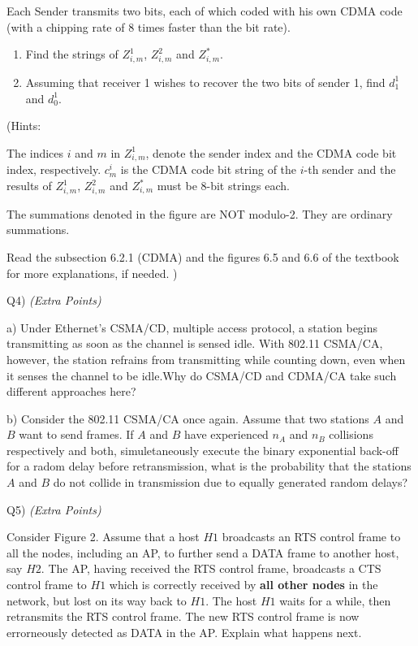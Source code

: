 \documentclass[10pt,letterpaper]{article}
\begin{document}
Each Sender transmits two bits, each of which coded with his own CDMA code (with a chipping rate of 8 times faster than the bit rate).
\begin{enumerate}[label=\alph*-]
\item
Find the strings of $Z_{i,m}^1$, $Z_{i,m}^2$ and $Z_{i,m}^*$.
\item
Assuming that receiver 1 wishes to recover the two bits of sender 1, find $d_1^1$ and $d_0^1$.
\end{enumerate}
(Hints:

The indices $i$ and $m$ in $Z_{i,m}^1$, denote the sender index and the CDMA code bit index, respectively. $c_m^i$ is the CDMA code bit string of the $i$-th sender and the results of $Z_{i,m}^1$, $Z_{i,m}^2$ and $Z_{i,m}^*$ must be 8-bit strings each.

The summations denoted in the figure are NOT modulo-2. They are ordinary summations.

Read the subsection 6.2.1 (CDMA) and the figures 6.5 and 6.6 of the textbook for more explanations, if needed.
)

Q4) \textit{(Extra Points)}

a) Under Ethernet's CSMA/CD, multiple access protocol, a station begins transmitting as soon as the channel is sensed idle. With 802.11 CSMA/CA, however, the station refrains from transmitting while counting down, even when it senses the channel to be idle.Why do CSMA/CD and CDMA/CA take such different approaches here?

b) Consider the 802.11 CSMA/CA once again. Assume that two stations $A$ and $B$ want to send frames. If $A$ and $B$ have experienced $n_A$ and $n_B$ collisions respectively and both, simuletaneously execute the binary exponential back-off for a radom delay before retransmission, what is the probability that the stations $A$ and $B$ do not collide in transmission due to equally generated random delays?

Q5) \textit{(Extra Points)}

Consider Figure 2. Assume that a host $H1$ broadcasts an RTS control frame to all the nodes, including an AP, to further send a DATA frame to another host, say $H2$. The AP, having received the RTS control frame, broadcasts a CTS control frame to $H1$
 which is correctly received by \textbf{all other nodes} in the network, but lost on its way back to $H1$. The host $H1$ waits for a while, then retransmits the RTS control frame. The new RTS control frame is now errorneously detected as DATA in the AP. Explain what happens next.
\end{document}
